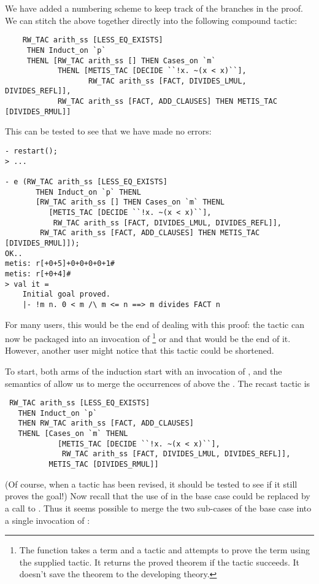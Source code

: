 We have added a numbering scheme to keep track of the branches in the
proof. We can stitch the above together directly into the following compound
tactic:

\begin{hol}
\begin{verbatim}
    RW_TAC arith_ss [LESS_EQ_EXISTS]
     THEN Induct_on `p`
     THENL [RW_TAC arith_ss [] THEN Cases_on `m`
            THENL [METIS_TAC [DECIDE ``!x. ~(x < x)``],
                   RW_TAC arith_ss [FACT, DIVIDES_LMUL, DIVIDES_REFL]],
            RW_TAC arith_ss [FACT, ADD_CLAUSES] THEN METIS_TAC [DIVIDES_RMUL]]
\end{verbatim}
\end{hol}

\noindent This can be tested to see that we have made no errors:

\begin{session}
\begin{verbatim}
- restart();
> ...

- e (RW_TAC arith_ss [LESS_EQ_EXISTS]
       THEN Induct_on `p` THENL 
       [RW_TAC arith_ss [] THEN Cases_on `m` THENL 
          [METIS_TAC [DECIDE ``!x. ~(x < x)``],
           RW_TAC arith_ss [FACT, DIVIDES_LMUL, DIVIDES_REFL]],
        RW_TAC arith_ss [FACT, ADD_CLAUSES] THEN METIS_TAC [DIVIDES_RMUL]]);
OK..
metis: r[+0+5]+0+0+0+0+1#
metis: r[+0+4]#
> val it =
    Initial goal proved.
    |- !m n. 0 < m /\ m <= n ==> m divides FACT n
\end{verbatim}
\end{session}

For many users, this would be the end of dealing with this proof: the
tactic can now be packaged into an invocation of
\footnote{The  function takes a term and a tactic
and attempts to prove the term using the supplied tactic.  It
returns the proved theorem if the tactic succeeds.  It doesn't save
the theorem to the developing theory.} or  and that
would be the end of it. However, another user might notice
that this tactic could be shortened.

To start, both arms of the induction start with an invocation of
, and the semantics of  allow us to merge the
occurrences of  above the . The recast tactic
is
\begin{hol}
\begin{verbatim}
 RW_TAC arith_ss [LESS_EQ_EXISTS]
   THEN Induct_on `p`
   THEN RW_TAC arith_ss [FACT, ADD_CLAUSES]
   THENL [Cases_on `m` THENL 
            [METIS_TAC [DECIDE ``!x. ~(x < x)``],
             RW_TAC arith_ss [FACT, DIVIDES_LMUL, DIVIDES_REFL]],
          METIS_TAC [DIVIDES_RMUL]]
\end{verbatim}
\end{hol}
(Of course, when a tactic has been revised, it should be tested to see
if it still proves the goal!) Now recall that the use of 
in the base case could be replaced by a call to . Thus
it seems possible to merge the two sub-cases of the base case into a
single invocation of :

